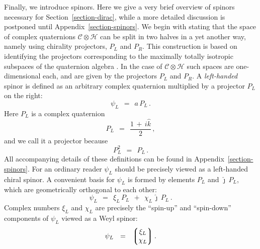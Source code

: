 \documentclass[epsfig,12pt]{article}
\newcommand{\jj}{\hat\jmath}
\newcommand{\kk}{\hat k}
\newcommand{\cC}{\mathcal{C}}
\newcommand{\cH}{\mathcal{H}}
\begin{document}
	Finally, we introduce spinors.
	Here we give a very brief overview of spinors necessary for Section~\ref{section-dirac}, while
	a more detailed discussion is postponed until Appendix~\ref{section-spinors}.
	We begin with stating that the space of complex quaternions $ \cC \otimes \cH $
	can be split in two halves in a yet another way, namely using chirality projectors, $ P_L $ and $ P_R $.
	This construction is based on identifying the projectors corresponding to the
	maximally totally isotropic subspaces of the quaternion algebra \cite{thesis}.
	In the case of $ \cC \otimes \cH $ such spaces are one-dimensional each, and are given
	by the projectors $ P_L $ and $ P_R $.
	A \emph{left-handed} spinor is defined as an arbitrary complex quaternion multiplied by 
	a projector $ P_L $ on the right:
\begin{equation}
	\psi_L	~~=~~	a\,P_L\,.
\end{equation}
	Here $ P_L $ is a complex quaternion
\begin{equation}
	P_L	~~=~~	\frac{1 \,+\, i\kk} 2\,,
\end{equation}
	and we call it a projector because
\[
	P_L^2	~~=~~	P_L\,.
\]
	All accompanying details of these definitions can be found in Appendix~\ref{section-spinors}.
	For an ordinary reader $ \psi_L $ should be precisely viewed as a left-handed
	chiral spinor.
	A convenient basis for $ \psi_L $ is formed by elements $ P_L $ and $ \jj\,P_L $,
	which are geometrically orthogonal to each other:
\begin{equation}
\label{lbasis}
	\psi_L	~~=~~	\xi_L\,P_L  ~~+~~  \chi_L\,\jj\,P_L\,.
\end{equation}
	Complex numbers $ \xi_L $ and $ \chi_L $ are precisely the ``spin-up'' and ``spin-down''
	components of $ \psi_L $ viewed as a Weyl spinor:
\begin{equation}
	\psi_L	~~=~~	\left\lgroup
				\begin{matrix}
					\xi_L \\
					\chi_L
                		\end{matrix}
			\right\rgroup.
\end{equation}
\end{document}
